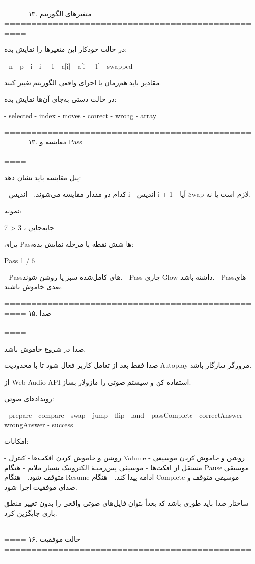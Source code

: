 ==================================================
۱۳. متغیرهای الگوریتم
==================================================

در حالت خودکار این متغیرها را نمایش بده:

- n
- p
- i
- i + 1
- a[i]
- a[i + 1]
- swapped

مقادیر باید هم‌زمان با اجرای واقعی الگوریتم تغییر کنند.

در حالت دستی به‌جای آن‌ها نمایش بده:

- selected
- index
- moves
- correct
- wrong
- array

==================================================
۱۴. مقایسه و Pass
==================================================

پنل مقایسه باید نشان دهد:

- کدام دو مقدار مقایسه می‌شوند.
- اندیس i
- اندیس i + 1
- آیا Swap لازم است یا نه.

نمونه:

7 > 3 ، جابه‌جایی

برای Passها شش نقطه یا مرحله نمایش بده:

Pass 1 / 6

- Passهای کامل‌شده سبز یا روشن شوند.
- Pass جاری Glow داشته باشد.
- Passهای بعدی خاموش باشند.

==================================================
۱۵. صدا
==================================================

صدا در شروع خاموش باشد.

صدا فقط بعد از تعامل کاربر فعال شود تا با محدودیت Autoplay مرورگر سازگار باشد.

از Web Audio API استفاده کن و سیستم صوتی را ماژولار بساز.

رویدادهای صوتی:

- prepare
- compare
- swap
- jump
- flip
- land
- passComplete
- correctAnswer
- wrongAnswer
- success

امکانات:

- روشن و خاموش کردن افکت‌ها
- کنترل Volume
- روشن و خاموش کردن موسیقی مستقل از افکت‌ها
- موسیقی پس‌زمینهٔ الکترونیک بسیار ملایم
- هنگام Pause موسیقی متوقف شود.
- هنگام Resume ادامه پیدا کند.
- هنگام Complete موسیقی متوقف و صدای موفقیت اجرا شود.

ساختار صدا باید طوری باشد که بعداً بتوان فایل‌های صوتی واقعی را بدون تغییر منطق بازی جایگزین کرد.

==================================================
۱۶. حالت موفقیت
==================================================

